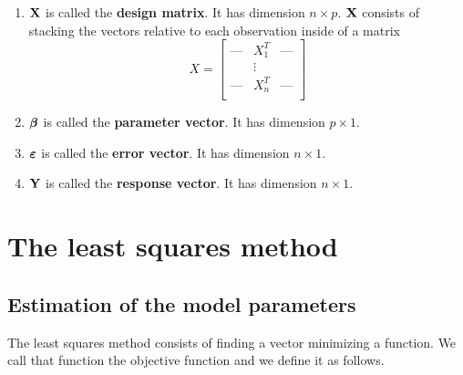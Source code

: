 \begin{definition}
    \begin{enumerate}[label=(\alph*)]
        \item $\mathbf{X}$ is called the \textbf{design matrix}. It has dimension $n \times p$. $\mathbf{X}$ consists of stacking the vectors relative to each observation inside of a matrix
              \[
                  X =
                  \begin{bmatrix}
                      \text{---} & X_1^T  & \text{---} \\
                                 & \vdots &            \\
                      \text{---} & X_n^T  & \text{---} \\
                  \end{bmatrix}
              \]
        \item $\boldsymbol{\beta}$ is called the \textbf{parameter vector}. It has dimension $p \times 1$.
        \item $\boldsymbol{\varepsilon}$ is called the \textbf{error vector}. It has dimension $n \times 1$.
        \item $\mathbf{Y}$ is called the \textbf{response vector}. It has dimension $n \times 1$.
    \end{enumerate}
\end{definition}

\section{The least squares method}
\subsection{Estimation of the model parameters}

The least squares method consists of finding a vector minimizing a function. We call that function the objective function and we define it as follows.

